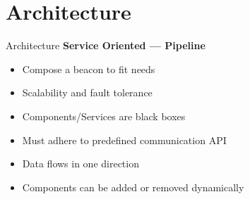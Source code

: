 \section{Architecture}

\begin{frame}[t]{Architecture}
    \textbf{Service Oriented --- Pipeline}
    \begin{itemize}
        \item Compose a beacon to fit needs
        \item \alert{Scalability} and fault tolerance
        \item Components/Services are \alert{black boxes}
        \item Must adhere to predefined communication API
        \item Data flows in one direction
        \item Components can be added or removed \alert{dynamically}
    \end{itemize}
\end{frame}

